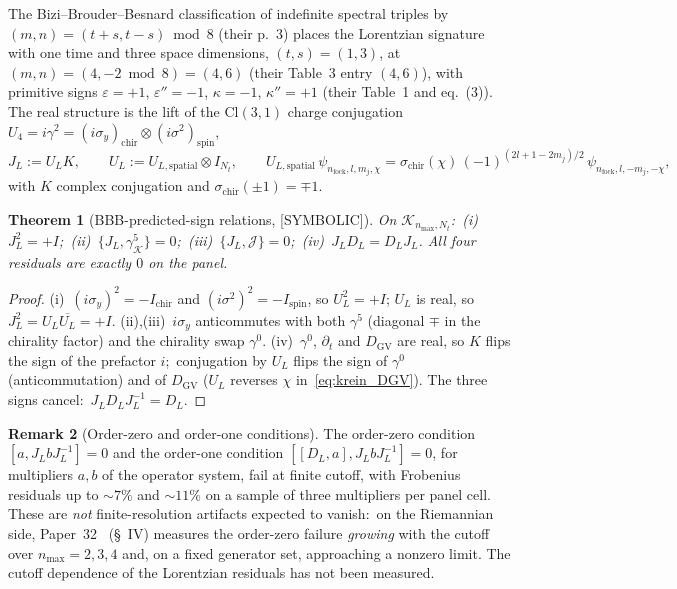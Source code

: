 \documentclass[11pt,a4paper]{article}
\theoremstyle{plain}
\newtheorem{theorem}{Theorem}[section]
\theoremstyle{definition}
\newtheorem{remark}[theorem]{Remark}
\newcommand{\nmax}{n_{\max}}
\newcommand{\Krein}{\mathcal{K}}
\newcommand{\Nt}{N_t}
\newcommand{\DGV}{D_{\mathrm{GV}}}
\newcommand{\DL}{D_{L}}
\newcommand{\JL}{J_{L}}
\newcommand{\Cl}{\mathrm{Cl}}
\begin{document}
The Bizi--Brouder--Besnard classification of indefinite spectral triples
by $(m, n) = (t + s, t - s) \bmod 8$ (their p.~3) places the Lorentzian
signature with one time and three space dimensions, $(t, s) = (1, 3)$, at
$(m, n) = (4, -2 \bmod 8) = (4, 6)$ (their Table~3 entry $(4, 6)$), with
primitive signs
$\varepsilon = +1$, $\varepsilon'' = -1$, $\kappa = -1$, $\kappa'' = +1$
(their Table~1 and eq.~(3)).  The real structure is the lift of the $\Cl(3, 1)$
charge conjugation $U_4 = i\gamma^2 = (i\sigma_y)_{\mathrm{chir}}
\otimes (i\sigma^2)_{\mathrm{spin}}$,
\begin{equation}\label{eq:JL_def}
   \JL := U_L K, \qquad U_L := U_{L,\mathrm{spatial}} \otimes I_{\Nt},
   \qquad
   U_{L,\mathrm{spatial}}\,\psi_{n_{\mathrm{fock}}, l, m_j, \chi}
   = \sigma_{\mathrm{chir}}(\chi)\,(-1)^{(2l+1-2m_j)/2}\,
     \psi_{n_{\mathrm{fock}}, l, -m_j, -\chi},
\end{equation}
with $K$ complex conjugation and $\sigma_{\mathrm{chir}}(\pm 1) = \mp 1$.

\begin{theorem}[BBB-predicted-sign relations, {[SYMBOLIC]}]
\label{thm:connes_audit}
On $\Krein_{\nmax, \Nt}$:\ (i)~$\JL^2 = +I$;\
(ii)~$\{\JL, \gamma^5_{\Krein}\} = 0$;\
(iii)~$\{\JL, \mathcal{J}\} = 0$;\
(iv)~$\JL\DL = \DL\JL$.
All four residuals are exactly $0$ on the panel.
\end{theorem}

\begin{proof}
(i)~$(i\sigma_y)^2 = -I_{\mathrm{chir}}$ and $(i\sigma^2)^2 = -I_{\mathrm{spin}}$,
so $U_L^2 = +I$; $U_L$ is real, so $\JL^2 = U_L\overline{U_L} = +I$.
(ii),(iii)~$i\sigma_y$ anticommutes with both $\gamma^5$ (diagonal
$\mp$ in the chirality factor) and the chirality swap $\gamma^0$.
(iv)~$\gamma^0$, $\partial_t$ and $\DGV$ are real, so $K$ flips the sign
of the prefactor $i$;\ conjugation by $U_L$ flips the sign of $\gamma^0$
(anticommutation) and of $\DGV$ ($U_L$ reverses $\chi$
in~\eqref{eq:krein_DGV}).  The three signs cancel:\
$\JL\DL\JL^{-1} = \DL$.
\end{proof}

\begin{remark}[Order-zero and order-one conditions]
\label{rem:order_zero_one}
The order-zero condition $[a, \JL b\JL^{-1}] = 0$ and the order-one
condition $[[\DL, a], \JL b\JL^{-1}] = 0$, for multipliers $a, b$ of the
operator system, fail at finite cutoff, with Frobenius residuals up to
$\sim 7\%$ and $\sim 11\%$ on a sample of three multipliers per panel
cell.  These are \emph{not} finite-resolution artifacts expected to
vanish:\ on the Riemannian side, Paper~32~\cite{paper32} (\S~IV) measures
the order-zero failure \emph{growing} with the cutoff over
$\nmax = 2, 3, 4$ and, on a fixed generator set, approaching a nonzero
limit.  The cutoff dependence of the Lorentzian residuals has not been
measured.
\end{remark}
\end{document}
